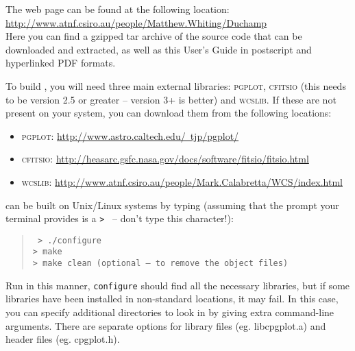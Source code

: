 \label{app-install}

The \duchamp web page can be found at the following location:\\
\href{http://www.atnf.csiro.au/people/Matthew.Whiting/Duchamp}%
{http://www.atnf.csiro.au/people/Matthew.Whiting/Duchamp}\\
Here you can find a gzipped tar archive of the source code that can be
downloaded and extracted, as well as this User's Guide in postscript
and hyperlinked PDF formats.

To build \duchamp, you will need three main external libraries:
\textsc{pgplot}, \textsc{cfitsio} (this needs to be version 2.5 or
greater -- version 3+ is better) and \textsc{wcslib}. If these are not
present on your system, you can download them from the following
locations:
\begin{itemize}
\item \textsc{pgplot}:
\href{http://www.astro.caltech.edu/~tjp/pgplot/}%
{\footnotesize http://www.astro.caltech.edu/~tjp/pgplot/}
\item \textsc{cfitsio}:
\href{http://heasarc.gsfc.nasa.gov/docs/software/fitsio/fitsio.html}%
{\footnotesize http://heasarc.gsfc.nasa.gov/docs/software/fitsio/fitsio.html}
\item \textsc{wcslib}:
\href{http://www.atnf.csiro.au/people/Mark.Calabretta/WCS/index.html}%
{\footnotesize http://www.atnf.csiro.au/people/Mark.Calabretta/WCS/index.html}
\end{itemize}

\duchamp can be built on Unix/Linux systems by typing (assuming that
the prompt your terminal provides is a \texttt{> } -- don't type this
character!):
\begin{quote}
{\footnotesize
\texttt{%
> ./configure\\
> make\\
> make clean (optional -- to remove the object files)}
}
\end{quote}

Run in this manner, \texttt{configure} should find all the necessary
libraries, but if some libraries have been installed in non-standard
locations, it may fail. In this case, you can specify additional
directories to look in by giving extra command-line arguments. There
are separate options for library files (eg. libcpgplot.a) and header
files (eg. cpgplot.h).

